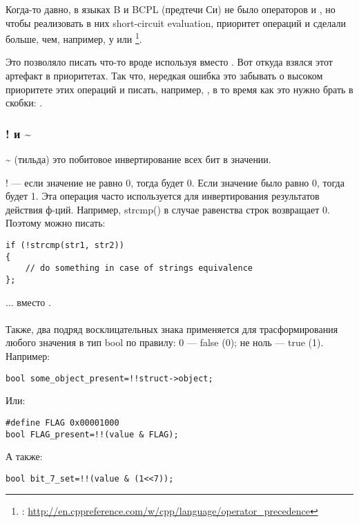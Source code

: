 Когда-то давно\cite{dmr:1995}, в языках B и BCPL (предтечи Си) не было операторов \IT{\&\&} и \IT{||}, 
но чтобы реализовать в них
short-circuit evaluation, приоритет операций \IT{\&} и \IT{|} сделали больше, чем, например, у \IT{\^} или \IT{+}
\footnote{: \url{http://en.cppreference.com/w/cpp/language/operator_precedence}}.

Это позволяло писать что-то вроде  используя \IT{\&} вместо \IT{\&\&}. Вот откуда взялся
этот артефакт в приоритетах.
Так что, нередкая ошибка это забывать о высоком приоритете этих операций и писать, например,
, в то время как это нужно брать в скобки: .

\subsubsection{! и \~{}}

\~{} (тильда) это побитовое инвертирование всех бит в значении.

! --- если значение не равно 0, тогда будет 0. Если значение было равно 0, тогда будет 1. Эта операция часто
используется для инвертирования результатов действия ф-ций. Например, strcmp() в случае равенства строк возвращает 0.
Поэтому можно писать:

\begin{lstlisting}
if (!strcmp(str1, str2))
{
	// do something in case of strings equivalence
};
\end{lstlisting}

... вместо . \\
\\
Также, два подряд восклицательных знака применяется для трасформирования любого значения в тип bool
по правилу: 0 --- false (0); не ноль --- true (1).
Например:

\begin{lstlisting}
bool some_object_present=!!struct->object;
\end{lstlisting}

Или:

\begin{lstlisting}
#define FLAG 0x00001000
bool FLAG_present=!!(value & FLAG);
\end{lstlisting}

А также:

\begin{lstlisting}
bool bit_7_set=!!(value & (1<<7));
\end{lstlisting}

